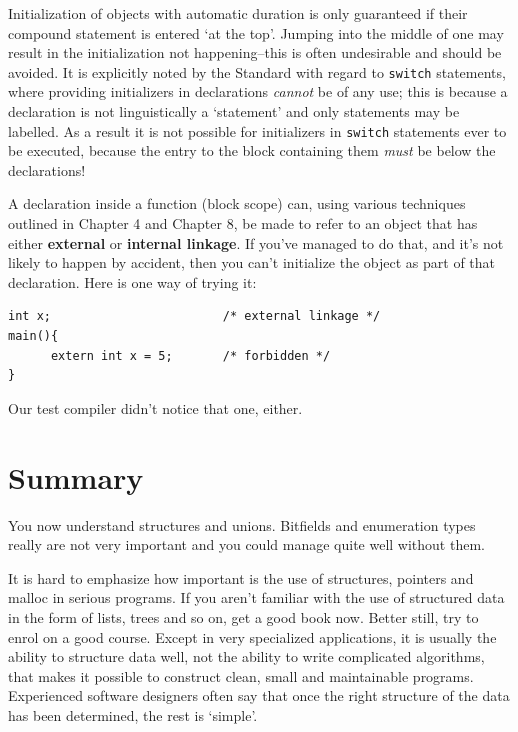    Initialization of objects with automatic duration is only guaranteed if
    their compound statement is entered `at the top'. Jumping into the
    middle of one may result in the initialization not happening--this is
    often undesirable and should be avoided. It is explicitly noted by the
    Standard with regard to \texttt{switch} statements, where providing
    initializers in declarations \textit{cannot} be of any use; this is because
    a declaration is not linguistically a `statement' and only statements
    may be labelled. As a result it is not possible for initializers in
    \texttt{switch} statements ever to be executed, because the entry to
    the block containing them \textit{must} be below the declarations!


   A declaration inside a function (block scope) can, using various
    techniques outlined in Chapter 4 and Chapter 8,
    be made to refer to an object that has either \textbf{external} or
    \textbf{internal linkage}. If you've managed to do that, and it's not
    likely to happen by accident, then you can't initialize the object as part
    of that declaration. Here is one way of trying it:


   \begin{Verbatim}
int x;                        /* external linkage */
main(){
      extern int x = 5;       /* forbidden */
}
\end{Verbatim}

   Our test compiler didn't notice that one, either.


  

 
        \section{Summary}
        


  You now understand structures and unions. Bitfields and enumeration types
   really are not very important and you could manage quite well without
   them.


  It is hard to emphasize how important is the use of structures, pointers
   and malloc in serious programs. If you aren't familiar with the use of
   structured data in the form of lists, trees and so on, get a good book now.
   Better still, try to enrol on a good course. Except in very specialized
   applications, it is usually the ability to structure data well, not the
   ability to write complicated algorithms, that makes it possible to construct
   clean, small and maintainable programs. Experienced software designers often
   say that once the right structure of the data has been determined, the rest
   is `simple'.


